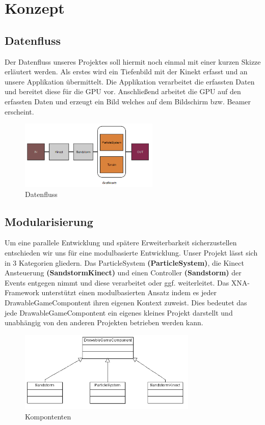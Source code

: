 \chapter{Konzept}
\begin{Spacing}{\mylinespace}

\section{Datenfluss}
Der Datenfluss unseres Projektes soll hiermit noch einmal mit einer kurzen Skizze erläutert werden.
Als erstes wird ein Tiefenbild mit der Kinekt erfasst und an unsere Applikation übermittelt.
Die Applikation verarbeitet die erfassten Daten und bereitet diese für die GPU vor.
Anschließend arbeitet die GPU auf den erfassten Daten und erzeugt ein Bild welches auf dem Bildschirm bzw. Beamer erscheint.
\begin{figure}[h!]
	\centering
	\vspace*{20px}
	\includegraphics[width=250px]{graphics/flow.png}
	\caption{Datenfluss}
	\label{fig:dataFlow}
\end{figure}

\section{Modularisierung}
Um eine parallele Entwicklung und spätere Erweiterbarkeit sicherzustellen entschieden wir uns für eine modulbasierte Entwicklung.
Unser Projekt lässt sich in 3 Kategorien gliedern. Das ParticleSystem \textbf{(ParticleSystem)}, die Kinect Ansteuerung \textbf{(SandstormKinect)} und einen Controller \textbf{(Sandstorm)} der Events entgegen nimmt und diese verarbeitet oder ggf. weiterleitet.
Das XNA-Framework unterstützt einen modulbasierten Ansatz indem es jeder DrawableGameCompontent ihren eigenen Kontext zuweist.
Dies bedeutet das jede DrawableGameCompontent ein eigenes kleines Projekt darstellt und unabhängig von den anderen Projekten betrieben werden kann.
\begin{figure}[h!]
	\centering
	\vspace*{20px}
	\includegraphics[width=320px]{graphics/DrawableGame.png}
	\caption{Kompontenten}
	\label{fig:singleColor}
\end{figure}


\end{Spacing}
